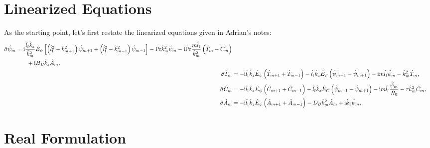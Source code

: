 \documentclass{article}
\newcommand{\shat}{\hat{\sigma}}
\newcommand{\phat}{\hat{\psi}}
\newcommand{\That}{\hat{T}}
\newcommand{\Chat}{\hat{C}}
\newcommand{\Ahat}{\hat{A}}
\newcommand{\khat}{\hat{k}}
\newcommand{\lhatf}{\hat{l}_{\rm f}}
\newcommand{\Prd}{\mathrm{Pr}}
\newcommand{\Rz}{R_{0}}
\newcommand{\HB}{H_{B}}
\newcommand{\DB}{D_{B}}
\newcommand{\EhatT}{\hat{E}_{T}}
\newcommand{\EhatC}{\hat{E}_{C}}
\newcommand{\Ehatp}{\hat{E}_{\psi}}
\newcommand{\ii}{\mathrm{i}}
\begin{document}
\section{Linearized Equations}

As the starting point, let's first restate the linearized equations
given in Adrian's notes:
%
\begin{align}
  \begin{split}
  \shat \phat_{m} &=
  \ii \frac{\lhatf \khat_z}{\khat^2_m} \Ehatp \left[
    \left( \lhatf^2 - \khat^2_{m+1} \right) \phat_{m+1}
    + \left( \lhatf^2 - \khat^2_{m-1} \right) \phat_{m-1}
    \right]
  - \Prd \khat^2_m \phat_m
  - \ii \Prd \frac{m \lhatf}{\khat_m^2} \left( \That_m - \Chat_m \right) \\
  & \qquad + \ii \HB \khat_z \Ahat_m,
  \end{split} \\
  \shat \That_m &=
  - \ii \lhatf \khat_z \Ehatp \left( \That_{m+1} + \That_{m-1} \right)
  - \lhatf \khat_z \EhatT \left( \phat_{m-1} - \phat_{m+1} \right)
  - \ii m \lhatf \phat_m
  - \khat^2_m \That_m, \\
  \shat \Chat_m &=
  - \ii \lhatf \khat_z \Ehatp \left( \Chat_{m+1} + \Chat_{m-1} \right)
  - \lhatf \khat_z \EhatC \left( \phat_{m-1} - \phat_{m+1} \right)
  - \ii m \lhatf \frac{\phat_m}{\Rz}
  - \tau \khat^2_m \Chat_m, \\
  \shat \Ahat_m &=
  - \ii \lhatf \khat_z \Ehatp \left( \Ahat_{m+1} + \Ahat_{m-1} \right)
  - \DB \khat^2_m \Ahat_m
  + \ii \khat_z \phat_m,
\end{align}

\section{Real Formulation}
\end{document}
